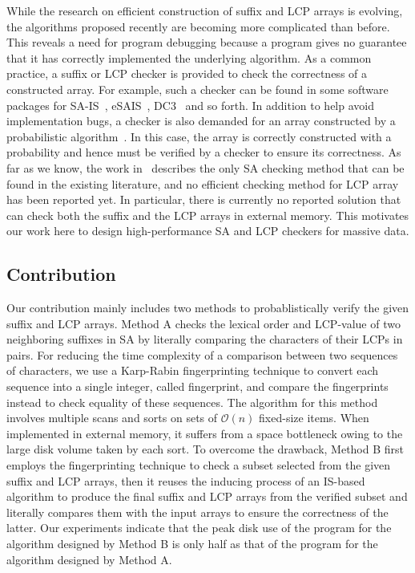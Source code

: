 \documentclass[10pt,journal,compsoc]{IEEEtran}
\begin{document}
While the research on efficient construction of suffix and LCP arrays is evolving, the algorithms proposed recently are becoming more complicated than before. This reveals a need for program debugging because a program gives no guarantee that it has correctly implemented the underlying algorithm. As a common practice, a suffix or LCP checker is provided to check the correctness of a constructed array. For example, such a checker can be found in some software packages for SA-IS~\cite{Nong11}, eSAIS~\cite{Bingmann12}, DC3~\cite{Dementiev08} and so forth. In addition to help avoid implementation bugs, a checker is also demanded for an array constructed by a probabilistic algorithm~\cite{Bille2013}. In this case, the array is correctly constructed with a probability and hence must be verified by a checker to ensure its correctness. As far as we know, the work in~\cite{Burkhardt2003} describes the only SA checking method that can be found in the existing literature, and no efficient checking method for LCP array has been reported yet. In particular, there is currently no reported solution that can check both the suffix and the LCP arrays in external memory. This motivates our work here to design high-performance SA and LCP checkers for massive data.  
	
\subsection{Contribution}\label{sec:introduction:contribution}

Our contribution mainly includes two methods to probablistically verify the given suffix and LCP arrays. Method A checks the lexical order and LCP-value of two neighboring suffixes in SA by literally comparing the characters of their LCPs in pairs. For reducing the time complexity of a comparison between two sequences of characters, we use a Karp-Rabin fingerprinting technique to convert each sequence into a single integer, called fingerprint, and compare the fingerprints instead to check equality of these sequences. The algorithm for this method involves multiple scans and sorts on sets of $\mathcal{O}(n)$ fixed-size items. When implemented in external memory, it suffers from a space bottleneck owing to the large disk volume taken by each sort. 
To overcome the drawback, Method B first employs the fingerprinting technique to check a subset selected from the given suffix and LCP arrays, then it reuses the inducing process of an IS-based algorithm to produce the final suffix and LCP arrays from the verified subset and literally compares them with the input arrays to ensure the correctness of the latter. Our experiments indicate that the peak disk use of the program for the algorithm designed by Method B is only half as that of the program for the algorithm designed by Method A.
\end{document}
